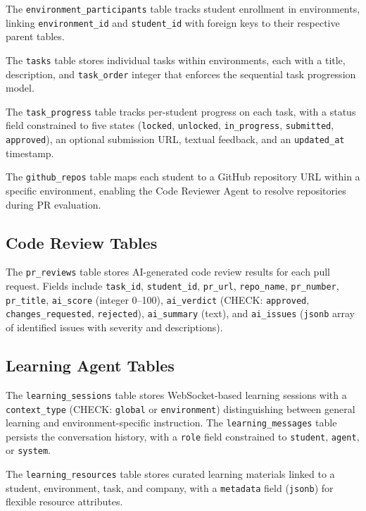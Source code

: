 \documentclass[12pt,a4paper]{report}
\begin{document}
The \texttt{environment\_participants} table tracks student enrollment in environments, linking \texttt{environment\_id} and \texttt{student\_id} with foreign keys to their respective parent tables.

The \texttt{tasks} table stores individual tasks within environments, each with a title, description, and \texttt{task\_order} integer that enforces the sequential task progression model.

The \texttt{task\_progress} table tracks per-student progress on each task, with a status field constrained to five states (\texttt{locked}, \texttt{unlocked}, \texttt{in\_progress}, \texttt{submitted}, \texttt{approved}), an optional submission URL, textual feedback, and an \texttt{updated\_at} timestamp.

The \texttt{github\_repos} table maps each student to a GitHub repository URL within a specific environment, enabling the Code Reviewer Agent to resolve repositories during PR evaluation.

\subsection{Code Review Tables}

The \texttt{pr\_reviews} table stores AI-generated code review results for each pull request. Fields include \texttt{task\_id}, \texttt{student\_id}, \texttt{pr\_url}, \texttt{repo\_name}, \texttt{pr\_number}, \texttt{pr\_title}, \texttt{ai\_score} (integer 0--100), \texttt{ai\_verdict} (CHECK: \texttt{approved}, \texttt{changes\_requested}, \texttt{rejected}), \texttt{ai\_summary} (text), and \texttt{ai\_issues} (\texttt{jsonb} array of identified issues with severity and descriptions).

\subsection{Learning Agent Tables}

The \texttt{learning\_sessions} table stores WebSocket-based learning sessions with a \texttt{context\_type} (CHECK: \texttt{global} or \texttt{environment}) distinguishing between general learning and environment-specific instruction. The \texttt{learning\_messages} table persists the conversation history, with a \texttt{role} field constrained to \texttt{student}, \texttt{agent}, or \texttt{system}.

The \texttt{learning\_resources} table stores curated learning materials linked to a student, environment, task, and company, with a \texttt{metadata} field (\texttt{jsonb}) for flexible resource attributes.
\end{document}
